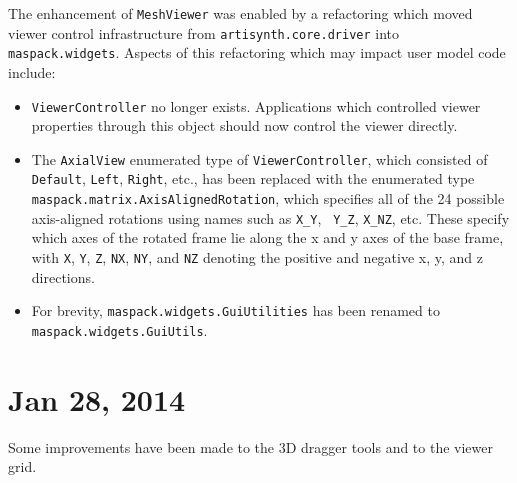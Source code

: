 \documentclass{article}
\begin{document}
The enhancement of {\tt MeshViewer} was enabled by a refactoring which
moved viewer control infrastructure from {\tt artisynth.core.driver} into
{\tt maspack.widgets}. Aspects of this refactoring which may impact
user model code include:

\begin{itemize}

\item {\tt ViewerController} no longer exists. Applications which
controlled viewer properties through this object should now control
the viewer directly.

\item The {\tt AxialView} enumerated type of {\tt ViewerController},
which consisted of {\tt Default}, {\tt Left}, {\tt Right}, etc., has
been replaced with the enumerated type {\tt
maspack.matrix.AxisAlignedRotation}, which specifies all of the 24
possible axis-aligned rotations using names such as {\tt X\_Y}, {\tt
Y\_Z}, {\tt X\_NZ}, etc. These specify which axes of the rotated frame
lie along the x and y axes of the base frame, with {\tt X}, {\tt Y},
{\tt Z}, {\tt NX}, {\tt NY}, and {\tt NZ} denoting the positive and
negative x, y, and z directions.

\item For brevity, {\tt maspack.widgets.GuiUtilities} has been renamed
to {\tt maspack.widgets.GuiUtils}.

\end{itemize}

\section*{Jan 28, 2014}

Some improvements have been made to the 3D dragger tools and to the
viewer grid.
\end{document}
